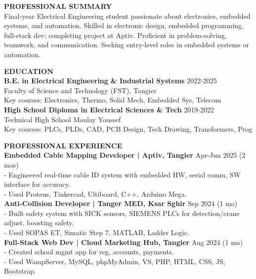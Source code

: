 \documentclass{article}
\begin{document}
\begin{minipage}[t]{0.66\textwidth}
{\color{sectionteal}\large\bfseries PROFESSIONAL SUMMARY} \\[0.05em]
Final-year Electrical Engineering student passionate about electronics, embedded systems, and automation. Skilled in electronic design, embedded programming, full-stack dev; completing project at Aptiv. Proficient in problem-solving, teamwork, and communication. Seeking entry-level roles in embedded systems or automation.

\vspace{1.5em}
{\color{sectionteal}\large\bfseries EDUCATION} \\[0.05em]
\textbf{B.E. in Electrical Engineering \& Industrial Systems} \hfill 2022-2025 \\
Faculty of Science and Technology (FST), Tangier \\
Key courses: Electronics, Thermo, Solid Mech, Embedded Sys, Telecom \\[0.3em]
\textbf{High School Diploma in Electrical Sciences \& Tech} \hfill 2019-2022 \\
Technical High School Moulay Youssef \\
Key courses: PLCs, PLDs, CAD, PCB Design, Tech Drawing, Transformers, Prog

\vspace{1.5em}
{\color{sectionteal}\large\bfseries PROFESSIONAL EXPERIENCE} \\[0.05em]
\textbf{Embedded Cable Mapping Developer | Aptiv, Tangier} \hfill Apr-Jun 2025 (2 mos) \\
- Engineered real-time cable ID system with embedded HW, serial comm, SW interface for accuracy. \\
- Used Proteus, Tinkercad, Ultiboard, C++, Arduino Mega. \\[0.3em]
\textbf{Anti-Collision Developer | Tanger MED, Ksar Sghir} \hfill Sep 2024 (1 mo) \\
- Built safety system with SICK sensors, SIEMENS PLCs for detection/crane adjust, boosting safety. \\
- Used SOPAS ET, Simatic Step 7, MATLAB, Ladder Logic. \\[0.3em]
\textbf{Full-Stack Web Dev | Cloud Marketing Hub, Tangier} \hfill Aug 2024 (1 mo) \\
- Created school mgmt app for reg, accounts, payments. \\
- Used WampServer, MySQL, phpMyAdmin, VS, PHP, HTML, CSS, JS, Bootstrap.


\end{minipage}
\end{document}
